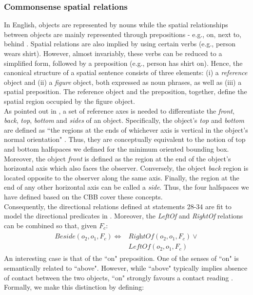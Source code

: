 \documentclass{article}
\begin{document}
\subsubsection{Commonsense spatial relations}
In English, objects are represented by nouns while the spatial relationships between objects are mainly represented through prepositions - e.g., on, next to, behind \cite{landau_what_1993}. Spatial relations are also implied by using certain verbs (e.g., person wears shirt). However, almost invariably, these verbs can be reduced to a simplified form, followed by a preposition (e.g., person has shirt on). Hence, the canonical structure of a spatial sentence consists of three elements: (i) a \textit{reference} object and (ii) a \textit{figure} object, both expressed as noun phrases, as well as (iii) a spatial preposition. The reference object and the preposition, together, define the spatial region occupied by the figure object. \\
As pointed out in \cite{landau_what_1993}, a set of reference axes is needed to differentiate the \textit{front}, \textit{back}, \textit{top}, \textit{bottom} and \textit{sides} of an object. Specifically, the object's \textit{top} and \textit{bottom} are defined as ``the regions at the ends of whichever axis is vertical in the object's normal orientation" \cite{landau_what_1993}. Thus, they are conceptually equivalent to the notion of top and bottom halfspaces we defined for the minimum oriented bounding box. Moreover, the object \textit{front} is defined as the region at the end of the object's horizontal axis which also faces the observer.  Conversely, the object \textit{back} region is located opposite to the observer along the same axis. Finally, the region at the end of any other horizontal axis can be called a \textit{side}. Thus, the four halfspaces we have defined based on the CBB cover these concepts. \\
Consequently, the directional relations defined at statements 28-34 are fit to model the directional predicates in \cite{landau_what_1993}. Moreover, the \textit{LeftOf} and \textit{RightOf} relations can be combined so that, given $F_c$: 
\begin{align}
\begin{split}
   \textit{Beside} (o_2,o_1,F_c) \Leftrightarrow &{} \textit{RightOf} (o_2,o_1,F_c) \lor  \\  & \textit{LeftOf} (o_2,o_1,F_c) \end{split}
\end{align}
An interesting case is that of the ``on" preposition. One of the senses of ``on" is semantically related to ``above". However, while ``above" typically implies absence of contact between the two objects, ``on" strongly favours a contact reading \cite{landau_what_1993}. Formally, we make this distinction by defining:
\end{document}
